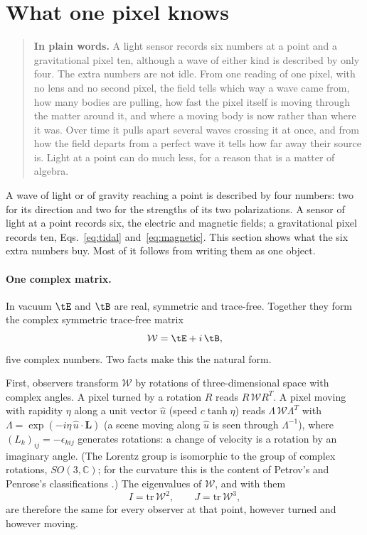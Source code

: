 \section{What one pixel knows}\label{sec:one-pixel}

\begin{quote}
\textbf{In plain words.} A light sensor records six numbers at a point and a
gravitational pixel ten, although a wave of either kind is described by only
four. The extra numbers are not idle. From one reading of one pixel, with no
lens and no second pixel, the field tells which way a wave came from, how many
bodies are pulling, how fast the pixel itself is moving through the matter
around it, and where a moving body is now rather than where it was. Over time
it pulls apart several waves crossing it at once, and from how the field
departs from a perfect wave it tells how far away their source is. Light at a
point can do much less, for a reason that is a matter of algebra.
\end{quote}

A wave of light or of gravity reaching a point is described by four numbers: two
for its direction and two for the strengths of its two polarizations. A sensor
of light at a point records six, the electric and magnetic fields; a
gravitational pixel records ten, Eqs.~\eqref{eq:tidal} and~\eqref{eq:magnetic}.
This section shows what the six extra numbers buy. Most of it follows from
writing them as one object.

\paragraph{One complex matrix.} In vacuum $\tE$ and $\tB$ are real, symmetric and
trace-free. Together they form the complex symmetric trace-free matrix
\begin{equation}\label{eq:W}
\mathcal{W} = \tE + i\,\tB ,
\end{equation}
five complex numbers. Two facts make this the natural form.

First, observers transform $\mathcal{W}$ by rotations of three-dimensional space with
complex angles. A pixel turned by a rotation $R$ reads $R\,\mathcal{W} R^{T}$. A pixel moving
with rapidity $\eta$ along a unit vector $\hat u$ (speed $c\tanh\eta$) reads
$\Lambda\,\mathcal{W}\Lambda^{T}$ with $\Lambda = \exp(-i\eta\,\hat u\cdot\mathbf{L})$ (a scene moving
along $\hat u$ is seen through $\Lambda^{-1}$), where
$(L_k)_{ij} = -\epsilon_{kij}$ generates rotations: a change of velocity is a
rotation by an imaginary angle. (The Lorentz group is isomorphic to the group of
complex rotations, $SO(3,\mathbb{C})$; for the curvature this is the content of
Petrov's and Penrose's classifications \cite{Petrov2000,Penrose1960}.) The
eigenvalues of $\mathcal{W}$, and with them
\begin{equation}\label{eq:invariants}
I = \mathrm{tr}\,\mathcal{W}^2, \qquad J = \mathrm{tr}\,\mathcal{W}^3,
\end{equation}
are therefore the same for every observer at that point, however turned and
however moving.

